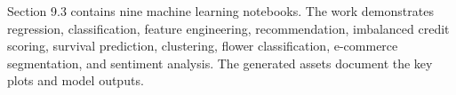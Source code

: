 Section 9.3 contains nine machine learning notebooks. The work demonstrates regression, classification, feature engineering, recommendation, imbalanced credit scoring, survival prediction, clustering, flower classification, e-commerce segmentation, and sentiment analysis. The generated assets document the key plots and model outputs.

